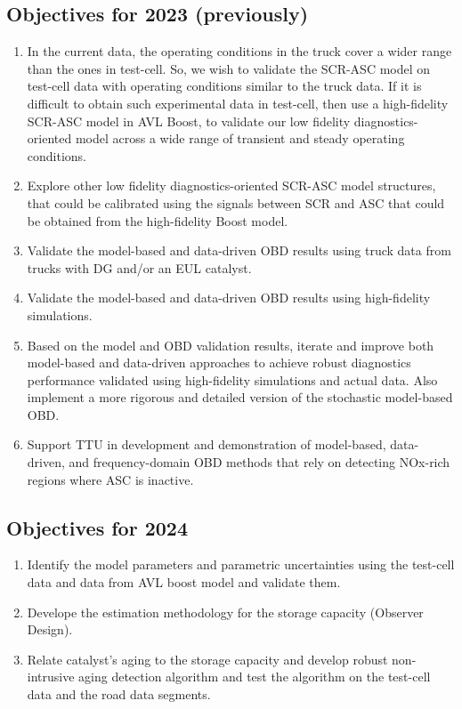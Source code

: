 \documentclass[letterpaper, 11pt]{article}
\begin{document}
\subsection{Objectives for 2023 (previously)}
\begin{enumerate}
 \item In the current data, the operating conditions in the truck cover a wider range than the ones in test-cell. So, we wish to validate the SCR-ASC model on test-cell data with operating conditions similar to the truck data. If it is difficult to obtain such experimental data in test-cell, then use a high-fidelity SCR-ASC model in AVL Boost, to validate our low fidelity diagnostics-oriented model across a wide range of transient and steady operating conditions.
 \item Explore other low fidelity diagnostics-oriented SCR-ASC model structures, that could be calibrated using the signals between SCR and ASC that could be obtained from the high-fidelity Boost model.
 \item Validate the model-based and data-driven OBD results using truck data from trucks with DG and/or an EUL catalyst.
 \item Validate the model-based and data-driven OBD results using high-fidelity simulations.
 \item Based on the model and OBD validation results, iterate and improve both model-based and data-driven approaches to achieve robust diagnostics performance validated using high-fidelity simulations and actual data. Also implement a more rigorous and detailed version of the stochastic model-based OBD.
 \item Support TTU in development and demonstration of model-based, data-driven, and frequency-domain OBD methods that rely on detecting NOx-rich regions where ASC is inactive.
\end{enumerate}


\subsection{Objectives for 2024}
\begin{enumerate}
\item Identify the model parameters and parametric uncertainties using
the test-cell data and data from AVL boost model and validate them.
\item Develope the estimation methodology for the storage capacity (Observer Design).
\item Relate catalyst's aging to the storage capacity and develop robust
non-intrusive aging detection algorithm and test the algorithm on the test-cell
data and the road data segments.
\end{enumerate}
\end{document}
